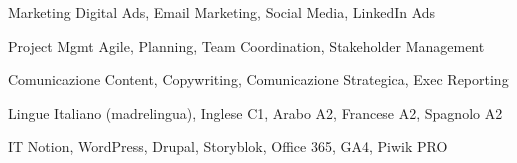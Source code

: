 

\begin{cvskills}

\cvskill
{Marketing} %
{Digital Ads, Email Marketing, Social Media, LinkedIn Ads}

\cvskill
{Project Mgmt} %
{Agile, Planning, Team Coordination, Stakeholder Management} %

\cvskill
{Comunicazione} %
{Content, Copywriting, Comunicazione Strategica, Exec Reporting} %



\cvskill
{Lingue} %
{Italiano (madrelingua), Inglese C1, Arabo A2, Francese A2, Spagnolo A2} %


\cvskill
{IT} %
{Notion, WordPress, Drupal, Storyblok, Office 365, GA4, Piwik PRO} %

\end{cvskills}
